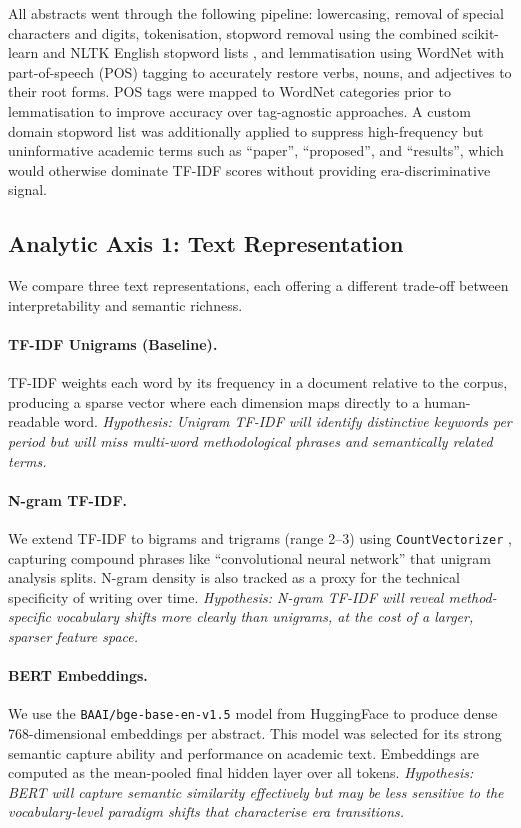 \documentclass{article}
\begin{document}
All abstracts went through the following pipeline:
lowercasing, removal of special characters and digits,
tokenisation, stopword removal using the combined
scikit-learn and NLTK English stopword lists
\citep{scikit-learn, nltk}, and lemmatisation using
WordNet with part-of-speech (POS) tagging to accurately
restore verbs, nouns, and adjectives to their root forms.
POS tags were mapped to WordNet categories prior to
lemmatisation to improve accuracy over tag-agnostic
approaches. A custom domain stopword list was additionally
applied to suppress high-frequency but uninformative
academic terms such as ``paper'', ``proposed'', and
``results'', which would otherwise dominate TF-IDF scores
without providing era-discriminative signal.

\subsection{Analytic Axis 1: Text Representation}
\label{subsec:representation}

We compare three text representations, each offering a
different trade-off between interpretability and semantic
richness.

\paragraph{TF-IDF Unigrams (Baseline).}
TF-IDF weights each word by its frequency in a document
relative to the corpus, producing a sparse vector where
each dimension maps directly to a human-readable word.
\textit{Hypothesis: Unigram TF-IDF will identify
distinctive keywords per period but will miss multi-word
methodological phrases and semantically related terms.}

\paragraph{N-gram TF-IDF.}
We extend TF-IDF to bigrams and trigrams (range 2--3)
using \texttt{CountVectorizer} \citep{scikit-learn},
capturing compound phrases like ``convolutional neural
network'' that unigram analysis splits. N-gram density
is also tracked as a proxy for the technical specificity
of writing over time.
\textit{Hypothesis: N-gram TF-IDF will reveal
method-specific vocabulary shifts more clearly than
unigrams, at the cost of a larger, sparser feature space.}

\paragraph{BERT Embeddings.}
We use the \texttt{BAAI/bge-base-en-v1.5} model
\citep{bge2023} from HuggingFace to produce dense
768-dimensional embeddings per abstract. This model was
selected for its strong semantic capture ability and
performance on academic text. Embeddings are computed as
the mean-pooled final hidden layer over all tokens.
\textit{Hypothesis: BERT will capture semantic similarity
effectively but may be less sensitive to the
vocabulary-level paradigm shifts that characterise era
transitions.}
\end{document}
